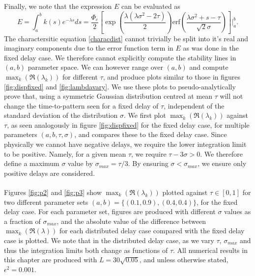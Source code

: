 Finally, we note that the expression $E$ can be evaluated as
\begin{equation}
E=\int_a^bk(s)e^{-\lambda s}ds=\frac{\Phi_c}{2}\left[\exp\left(\frac{\lambda(\lambda\sigma^2-2\tau)}{2}\right) \text{erf} \left(\frac{\lambda\sigma^2+s-\tau}{\sqrt{2}\sigma}\right)\right]\Bigg|_a^b.
\end{equation}
The charactersitic equation \eqref{characdist} cannot trivially be split into it's real and imaginary components due to the error function term in $E$ as was done in the fixed delay case. We therefore cannot explicitly compute the stability lines in $(a,b)$ parameter space. We can however range over $(a,b)$ and compute $\max_k(\Re(\lambda_k))$ for different $\tau$, and produce plots similar to those in figures \ref{fig:dispfixed} and \ref{fig:lambdavary}. We use these plots to pseudo-analytically prove that, using a symmetric Gaussian distribution centred at mean $\tau$ will not change the time-to-pattern seen for a fixed delay of $\tau$, independent of the standard deviation of the distribution $\sigma$. We first plot $\max_k(\Re(\lambda_k))$ against $\tau$, as seen analogously in figure \ref{fig:dispfixed} for the fixed delay case, for multiple parameters $(a,b,\tau,\sigma)$, and compares these to the fixed delay case. Since physically we cannot have negative delays, we require the lower integration limit to be positive. Namely, for a given mean $\tau$, we require $\tau-3\sigma>0$. We therefore define a maximum $\sigma$ value by $\sigma_{max}=\tau / 3$. By ensuring $\sigma<\sigma_{max}$, we ensure only positive delays are considered.
\\\\
Figures \ref{fig:p2} and \ref{fig:p3} show $\max_k(\Re(\lambda_k))$ plotted against $\tau\in[0,1]$ for two different parameter sets $(a,b)=\{(0.1,0.9), (0.4,0.4)\}$, for the fixed delay case. For each parameter set, figures are produced with different $\sigma$ values as a fraction of $\sigma_{max}$, and the absolute value of the difference between $\max_k(\Re(\lambda))$ for each distributed delay case compared with the fixed delay case is plotted. We note that in the distributed delay case, as we vary $\tau$, $\sigma_{max}$ and thus the integration limits both change as functions of $\tau$. All numerical results in this chapter are produced with $L=30\sqrt{0.05}$, and unless otherwise stated, $\epsilon^2=0.001$.

